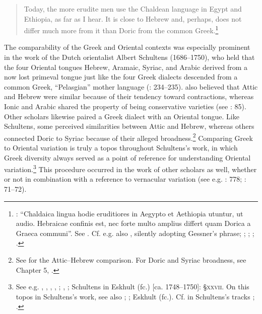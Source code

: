 \begin{quote}
Today, the more erudite men use the Chaldean language in Egypt and Ethiopia, as far as I hear. It is close to Hebrew and, perhaps, does not differ much more from it than Doric from the common Greek.\footnote{\citet[15\textsc{\textsuperscript{r}}]{Gessner1555}: “Chaldaica lingua hodie eruditiores in Aegypto et Aethiopia utuntur, ut audio. Hebraicae confinis est, nec forte multo amplius differt quam Dorica a Graeca communi”. See \citet[\textsc{i.}43]{Peters1970}. Cf. e.g. also \citet[325]{Rocca1591}, silently adopting Gessner’s phrase; \citet[459]{Saumaise1643a}; \citet[88]{Bagnati1732}; \citet[24]{Wesley1736}; \citet[22]{Eichhorn1780}.}
\end{quote}

The comparability of the Greek and Oriental contexts was especially prominent in the work of the Dutch orientalist Albert Schultens (1686–1750), who held that the four Oriental tongues Hebrew, Aramaic, Syriac, and Arabic derived from a now lost primeval tongue just like the four Greek dialects descended from a common Greek, “Pelasgian” mother language (\citealt{Schultens1739}: 234–235). \citet[\textsc{xcvi}]{Schultens1748} also believed that Attic and Hebrew were similar because of their tendency toward contractions, whereas Ionic and Arabic shared the property of being conservative varieties (see \citealt{Eskhult2015}: 85). Other scholars likewise paired a Greek dialect with an Oriental tongue. Like Schultens, some perceived similarities between Attic and Hebrew, whereas others connected Doric to Syriac because of their alleged broadness.\footnote{See \citet[425--432]{Lakemacher1730} for the Attic–Hebrew comparison. For Doric and Syriac broadness, see Chapter 5, .} Comparing Greek to Oriental variation is truly a topos throughout Schultens’s work, in which Greek diversity always served as a point of reference for understanding Oriental variation.\footnote{See e.g. \citet[490]{Schultens1769}, \citet[4]{Schultens1732}, \citet[5]{Schultens1737}, \citet[19--21]{Schultens1738a}, \citet[106--107, stressing that the Oriental and the Germanic contexts were less comparable]{Schultens1738b}; \citet[187]{Schultens1739}, \citet[\textsc{xcvi}]{Schultens1748}; Schultens in Eskhult (fc.) [ca. 1748–1750]: §\textsc{xxvii}. On this topos in Schultens’s work, see also \citet[105]{Fuck1955}; \citet[707]{Covington1979}; Eskhult (fc.). Cf. in Schultens’s tracks \citet[5]{Polier1739}; \citet{Groddeck1747}.} This procedure occurred in the work of other scholars as well, whether or not in combination with a reference to vernacular variation (see e.g. \citealt{Bochart1646}: 778; \citealt{Blount1680}: 71–72).

